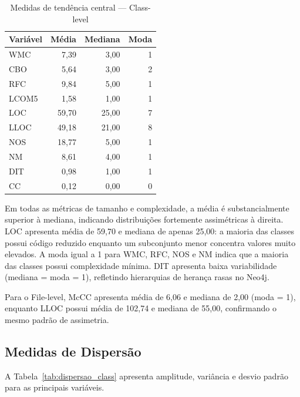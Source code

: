 \documentclass[12pt]{article}
\begin{document}
\begin{table}[H]
\centering
\caption{Medidas de tendência central --- Class-level}
\label{tab:tendencia_class}
\footnotesize
\begin{tabular}{lrrr}
\toprule
\textbf{Variável} & \textbf{Média} & \textbf{Mediana} & \textbf{Moda} \\
\midrule
WMC   &  7,39  &  3,00  &  1 \\
CBO   &  5,64  &  3,00  &  2 \\
RFC   &  9,84  &  5,00  &  1 \\
LCOM5 &  1,58  &  1,00  &  1 \\
LOC   & 59,70  & 25,00  &  7 \\
LLOC  & 49,18  & 21,00  &  8 \\
NOS   & 18,77  &  5,00  &  1 \\
NM    &  8,61  &  4,00  &  1 \\
DIT   &  0,98  &  1,00  &  1 \\
CC    &  0,12  &  0,00  &  0 \\
\bottomrule
\end{tabular}
\end{table}

Em todas as métricas de tamanho e complexidade, a média é substancialmente superior à mediana, indicando distribuições fortemente assimétricas à direita. LOC apresenta média de 59,70 e mediana de apenas 25,00: a maioria das classes possui código reduzido enquanto um subconjunto menor concentra valores muito elevados. A moda igual a 1 para WMC, RFC, NOS e NM indica que a maioria das classes possui complexidade mínima. DIT apresenta baixa variabilidade (mediana = moda = 1), refletindo hierarquias de herança rasas no Neo4j.

Para o File-level, McCC apresenta média de 6,06 e mediana de 2,00 (moda = 1), enquanto LLOC possui média de 102,74 e mediana de 55,00, confirmando o mesmo padrão de assimetria.

\subsection{Medidas de Dispersão}

A Tabela~\ref{tab:dispersao_class} apresenta amplitude, variância e desvio padrão para as principais variáveis.
\end{document}
